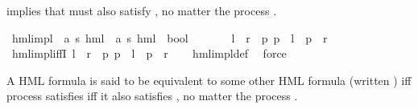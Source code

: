 \begin{isabellebody}
\begin{isamarkuptext}
implies that  must also satisfy , no matter the process .%
\end{isamarkuptext}\isamarkuptrue%
\isamarkupfalse%
\ hml{\isacharunderscore}{\kern0pt}impl\ {\isacharcolon}{\kern0pt}{\isacharcolon}{\kern0pt}\ {\isachardoublequoteopen}{\isacharparenleft}{\kern0pt}{\isacharprime}{\kern0pt}a{\isacharcomma}{\kern0pt}\ {\isacharprime}{\kern0pt}s{\isacharparenright}{\kern0pt}\ hml\ {\isasymRightarrow}\ {\isacharparenleft}{\kern0pt}{\isacharprime}{\kern0pt}a{\isacharcomma}{\kern0pt}\ {\isacharprime}{\kern0pt}s{\isacharparenright}{\kern0pt}\ hml\ {\isasymRightarrow}\ bool{\isachardoublequoteclose}\ {\isacharparenleft}{\kern0pt}\ {\isachardoublequoteopen}{\isasymRrightarrow}{\isachardoublequoteclose}\ {}{}{\isacharparenright}{\kern0pt}\ \ \isanewline
\ \ {\isachardoublequoteopen}{\isasymphi}l\ {\isasymRrightarrow}\ {\isasymphi}r\ {\isasymequiv}\ {\isacharparenleft}{\kern0pt}{\isasymforall}p{\isachardot}{\kern0pt}\ {\isacharparenleft}{\kern0pt}p\ {\isasymTurnstile}\ {\isasymphi}l{\isacharparenright}{\kern0pt}\ {\isasymlongrightarrow}\ {\isacharparenleft}{\kern0pt}p\ {\isasymTurnstile}\ {\isasymphi}r{\isacharparenright}{\kern0pt}{\isacharparenright}{\kern0pt}{\isachardoublequoteclose}\isanewline
\isanewline
{}\isamarkupfalse%
\ hml{\isacharunderscore}{\kern0pt}impl{\isacharunderscore}{\kern0pt}iffI{\isacharcolon}{\kern0pt}\ {\isachardoublequoteopen}{\isasymphi}l\ {\isasymRrightarrow}\ {\isasymphi}r\ {\isacharequal}{\kern0pt}\ {\isacharparenleft}{\kern0pt}{\isasymforall}p{\isachardot}{\kern0pt}\ {\isacharparenleft}{\kern0pt}p\ {\isasymTurnstile}\ {\isasymphi}l{\isacharparenright}{\kern0pt}\ {\isasymlongrightarrow}\ {\isacharparenleft}{\kern0pt}p\ {\isasymTurnstile}\ {\isasymphi}r{\isacharparenright}{\kern0pt}{\isacharparenright}{\kern0pt}{\isachardoublequoteclose}\isanewline
%
\isadelimproof
\ \ %
\endisadelimproof
%
\isatagproof
{}\isamarkupfalse%
\ hml{\isacharunderscore}{\kern0pt}impl{\isacharunderscore}{\kern0pt}def\ \isamarkupfalse%
\ force%
\endisatagproof
{\isafoldproof}%
%
\isadelimproof
%
\endisadelimproof
%
\isadelimdocument
%
\endisadelimdocument
%
\isatagdocument
%
\isamarkuptrue%
%
\endisatagdocument
{\isafolddocument}%
%
\isadelimdocument
%
\endisadelimdocument
%
\begin{isamarkuptext}%
A HML formula  is said to be equivalent to some other HML formula  (written )
iff process  satisfies  iff it also satisfies , no matter the process .


\end{isamarkuptext}
\end{isabellebody}
